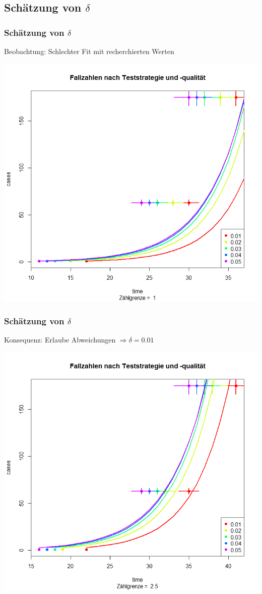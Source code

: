 \documentclass{beamer}
\begin{document}
\subsection{Schätzung von $\delta$}
\begin{frame}
	\frametitle{Schätzung von $\delta$}
	Beobachtung: Schlechter Fit mit recherchierten Werten 
	\begin{center}
		\includegraphics[scale=0.45]{delta_tol=1.png}
	\end{center}
\end{frame}

\begin{frame}
	\frametitle{Schätzung von $\delta$}
	Konsequenz: Erlaube Abweichungen $\Rightarrow \delta = 0.01$
	\begin{center}
		\includegraphics[scale=0.45]{delta_tol=2,5.png}
	\end{center}
\end{frame}
\end{document}

